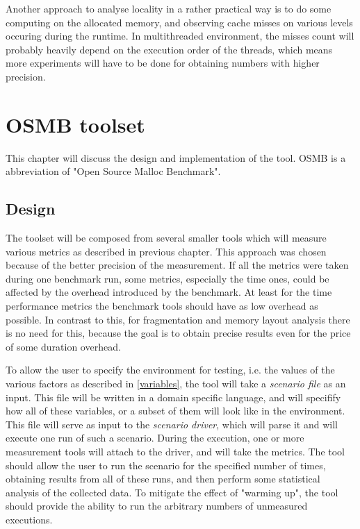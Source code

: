 Another approach to analyse locality in a rather practical way is to do some computing on the allocated memory, and observing cache misses on various levels occuring during the runtime. In multithreaded environment, the misses count will probably heavily depend on the execution order of the threads, which means more experiments will have to be done for obtaining numbers with higher precision.

\chapter{OSMB toolset}

This chapter will discuss the design and implementation of the tool. OSMB is a abbreviation of "Open Source Malloc Benchmark".

\section{Design}

The toolset will be composed from several smaller tools which will measure various metrics as described in previous chapter. This approach was chosen because of the better precision of the measurement. If all the metrics were taken during one benchmark run, some metrics, especially the time ones, could be affected by the overhead introduced by the benchmark. At least for the time performance metrics the benchmark tools should have as low overhead as possible. In contrast to this, for fragmentation and memory layout analysis there is no need for this, because the goal is to obtain precise results even for the price of some duration overhead.

To allow the user to specify the environment for testing, i.e. the values of the various factors as described in \ref{variables}, the tool will take a {\em scenario file} as an input. This file will be written in a domain specific language, and will specifify how all of these variables, or a subset of them will look like in the environment. This file will serve as input to the {\em scenario driver}, which will parse it and will execute one run of such a scenario. During the execution, one or more measurement tools will attach to the driver, and will take the metrics. The tool should allow the user to run the scenario for the specified number of times, obtaining results from all of these runs, and then perform some statistical analysis of the collected data. To mitigate the effect of "warming up", the tool should provide the ability to run the arbitrary numbers of unmeasured executions.

